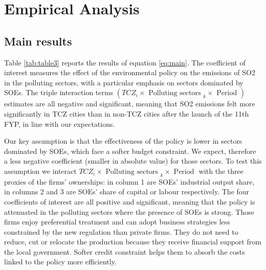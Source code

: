 \documentclass[12pt]{article}
\begin{document}
\section{Empirical Analysis} \label{sec:analysis}

\subsection{Main results}

Table \ref{tab:table3} reports the results of equation \ref{eq:main}. The coefficient of interest measures the effect of the environmental policy on the emissions of SO2 in the polluting sectors, with a particular emphasis on sectors dominated by SOEs. The triple interaction terms $(T C Z_{i} \times \text {  Polluting sectors }_{k} \times \text { Period })$ estimates are all negative and significant, meaning that SO2 emissions felt more significantly in TCZ cities than in non-TCZ cities after the launch of the 11th FYP, in line with our expectations.

Our key assumption is that the effectiveness of the policy is lower in sectors dominated by SOEs, which face a softer budget constraint. We expect, therefore a less negative coefficient (smaller in absolute value) for those sectors. To test this assumption we interact $T C Z_{i} \times \text {  Polluting sectors }_{k} \times \text { Period }$ with the three proxies of the firms' ownerships: in column 1 are SOEs' industrial output share, in columns 2 and 3 are SOEs' share of capital or labour respectively. The four coefficients of interest are all positive and significant, meaning that the policy is attenuated in the polluting sectors where the presence of SOEs is strong. Those firms enjoy preferential treatment and can adopt business strategies less constrained by the new regulation than private firms. They do not need to reduce, cut or relocate the production because they receive financial support from the local government. Softer credit constraint helps them to absorb the costs linked to the policy more efficiently.
\end{document}
